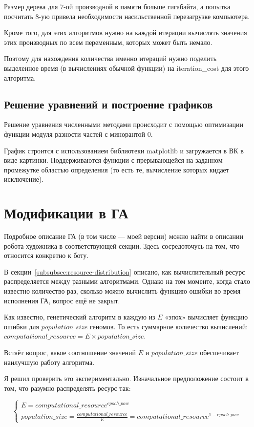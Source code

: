 \documentclass[11pt]{article}
\begin{document}
    Размер дерева для 7-ой производной в памяти больше гигабайта, а попытка посчитать 8-ую привела необходимости насильственной перезагрузке компьютера.

    Кроме того, для этих алгоритмов нужно на каждой итерации вычислять значения этих производных по всем переменным, которых может быть немало.

    Поэтому для нахождения количества именно итераций нужно поделить выделенное время (в вычислениях обычной функции) на
    iteration\_cost для этого алгоритма.

    \subsection{Решение уравнений и построение графиков}
    Решение уравнения численными методами происходит с помощью оптимизации функции модуля разности частей с минорантой 0.

    График строится с использованием библиотеки matplotlib и загружается в ВК в виде картинки.
    Поддерживаются функции с прерывающейся на заданном промежутке областью определения (то есть те, вычисление которых кидает исключение).

    \section{Модификации в ГА}\label{sec:ga-modifications}
    Подробное описание ГА (в том числе — моей версии) можно найти в описании робота-художника в соответствующей секции.
    Здесь сосредоточусь на том, что относится конкретно к боту.

    В секции~\ref{subsubsec:resource-distribution} описано, как вычислительный ресурс распределяется между разными алгоритмами.
    Однако на том моменте, когда стало известно количество раз, сколько можно вычислить функцию ошибки во время исполнения ГА,
    вопрос ещё не закрыт.

    Как известно, генетический алгоритм в каждую из $E$ «эпох» вычисляет функцию ошибки для $population\_size$ геномов.
    То есть суммарное количество вычислений: $computational\_resource = E \times population\_size$.

    Встаёт вопрос, какое соотношение значений $E$ и $population\_size$ обеспечивает наилучшую работу алгоритма.

    Я решил проверить это экспериментально.
    Изначальное предположение состоит в том, что разумно распределять ресурс так:

    \begin{equation}
        \begin{cases}
            E = computational\_resource^{epoch\_pow} \\
            population\_size = \frac{computational\_resource}{E} = computational\_resource^{1 - epoch\_pow}
        \end{cases}
    \end{equation}
\end{document}
